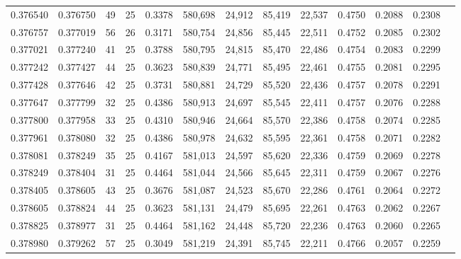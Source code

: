 \begin{tabular}{rrrrrrrrrrrrr}
0.376540 & 0.376750 &    49 &  25 &                                     0.3378 & 580,698 &  24,912 &  85,419 &  22,537 & 0.4750 & 0.2088 & 0.2308 \\
0.376757 & 0.377019 &    56 &  26 &                                     0.3171 & 580,754 &  24,856 &  85,445 &  22,511 & 0.4752 & 0.2085 & 0.2302 \\
0.377021 & 0.377240 &    41 &  25 &                                     0.3788 & 580,795 &  24,815 &  85,470 &  22,486 & 0.4754 & 0.2083 & 0.2299 \\
0.377242 & 0.377427 &    44 &  25 &                                     0.3623 & 580,839 &  24,771 &  85,495 &  22,461 & 0.4755 & 0.2081 & 0.2295 \\
0.377428 & 0.377646 &    42 &  25 &                                     0.3731 & 580,881 &  24,729 &  85,520 &  22,436 & 0.4757 & 0.2078 & 0.2291 \\
0.377647 & 0.377799 &    32 &  25 &                                     0.4386 & 580,913 &  24,697 &  85,545 &  22,411 & 0.4757 & 0.2076 & 0.2288 \\
0.377800 & 0.377958 &    33 &  25 &                                     0.4310 & 580,946 &  24,664 &  85,570 &  22,386 & 0.4758 & 0.2074 & 0.2285 \\
0.377961 & 0.378080 &    32 &  25 &                                     0.4386 & 580,978 &  24,632 &  85,595 &  22,361 & 0.4758 & 0.2071 & 0.2282 \\
0.378081 & 0.378249 &    35 &  25 &                                     0.4167 & 581,013 &  24,597 &  85,620 &  22,336 & 0.4759 & 0.2069 & 0.2278 \\
0.378249 & 0.378404 &    31 &  25 &                                     0.4464 & 581,044 &  24,566 &  85,645 &  22,311 & 0.4759 & 0.2067 & 0.2276 \\
0.378405 & 0.378605 &    43 &  25 &                                     0.3676 & 581,087 &  24,523 &  85,670 &  22,286 & 0.4761 & 0.2064 & 0.2272 \\
0.378605 & 0.378824 &    44 &  25 &                                     0.3623 & 581,131 &  24,479 &  85,695 &  22,261 & 0.4763 & 0.2062 & 0.2267 \\
0.378825 & 0.378977 &    31 &  25 &                                     0.4464 & 581,162 &  24,448 &  85,720 &  22,236 & 0.4763 & 0.2060 & 0.2265 \\
0.378980 & 0.379262 &    57 &  25 &                                     0.3049 & 581,219 &  24,391 &  85,745 &  22,211 & 0.4766 & 0.2057 & 0.2259 \\

\end{tabular}
